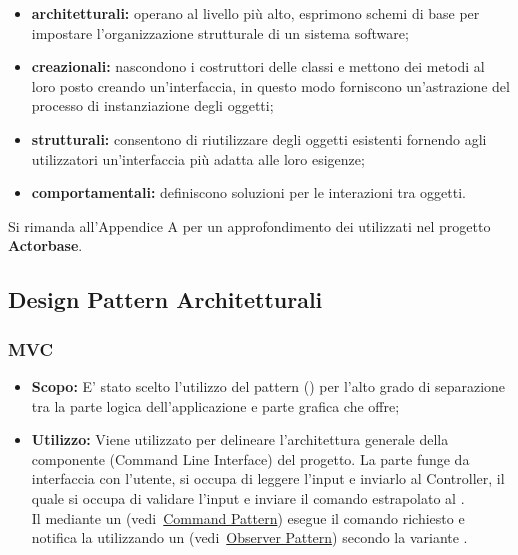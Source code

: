 \documentclass{scalatekids-article}
\begin{document}
\begin{itemize}
\item \textbf{architetturali:} operano al livello più alto,
  esprimono schemi di base per impostare l'organizzazione strutturale di un
  sistema software;
\item \textbf{creazionali:} nascondono i costruttori delle classi e mettono dei
  metodi al loro posto creando un'interfaccia, in questo modo forniscono
  un'astrazione del processo di instanziazione degli oggetti;
\item \textbf{strutturali:} consentono di riutilizzare degli oggetti esistenti
  fornendo agli utilizzatori un'interfaccia più adatta alle loro esigenze;
\item \textbf{comportamentali:} definiscono soluzioni per le interazioni tra
  oggetti.
\end{itemize}

Si rimanda all'Appendice A per un approfondimento dei 
utilizzati nel progetto \textbf{Actorbase}.

\subsection{Design Pattern Architetturali}

\subsubsection{MVC}

\begin{itemize}
\item \textbf{Scopo:} E' stato scelto l'utilizzo del pattern 
    () per l'alto grado di separazione
  tra la parte logica dell'applicazione e parte grafica che offre;
\item \textbf{Utilizzo:} Viene utilizzato per delineare l'architettura generale
  della componente  (Command Line Interface) del progetto. La parte
   funge da interfaccia con l'utente, si occupa di leggere l'input e
  inviarlo al Controller, il quale si occupa di validare l'input
  e inviare il comando estrapolato al .\\
  Il  mediante un  (vedi~\hyperref[sec:CommandPattern]{Command Pattern})
  esegue il comando richiesto e notifica la  utilizzando un 
  (vedi~\hyperref[sec:ObserverPattern]{Observer Pattern}) secondo la variante .
\end{itemize}
\end{document}
